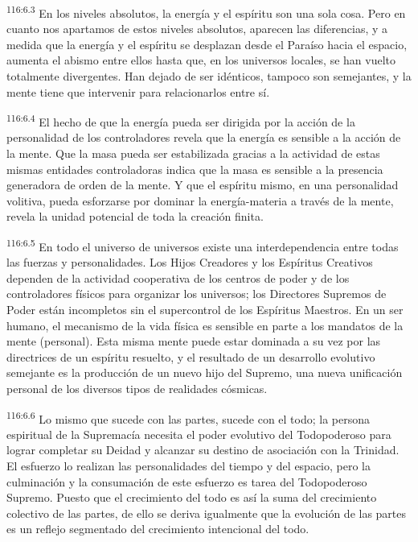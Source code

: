 \documentclass[twoside, 11pt]{book}
\begin{document}
\par
\textsuperscript{116:6.3} En los niveles absolutos, la energía y el espíritu son una sola cosa. Pero en cuanto nos apartamos de estos niveles absolutos, aparecen las diferencias, y a medida que la energía y el espíritu se desplazan desde el Paraíso hacia el espacio, aumenta el abismo entre ellos hasta que, en los universos locales, se han vuelto totalmente divergentes. Han dejado de ser idénticos, tampoco son semejantes, y la mente tiene que intervenir para relacionarlos entre sí.

\par
\textsuperscript{116:6.4} El hecho de que la energía pueda ser dirigida por la acción de la personalidad de los controladores revela que la energía es sensible a la acción de la mente. Que la masa pueda ser estabilizada gracias a la actividad de estas mismas entidades controladoras indica que la masa es sensible a la presencia generadora de orden de la mente. Y que el espíritu mismo, en una personalidad volitiva, pueda esforzarse por dominar la energía-materia a través de la mente, revela la unidad potencial de toda la creación finita.

\par
\textsuperscript{116:6.5} En todo el universo de universos existe una interdependencia entre todas las fuerzas y personalidades. Los Hijos Creadores y los Espíritus Creativos dependen de la actividad cooperativa de los centros de poder y de los controladores físicos para organizar los universos; los Directores Supremos de Poder están incompletos sin el supercontrol de los Espíritus Maestros. En un ser humano, el mecanismo de la vida física es sensible en parte a los mandatos de la mente (personal). Esta misma mente puede estar dominada a su vez por las directrices de un espíritu resuelto, y el resultado de un desarrollo evolutivo semejante es la producción de un nuevo hijo del Supremo, una nueva unificación personal de los diversos tipos de realidades cósmicas.

\par
\textsuperscript{116:6.6} Lo mismo que sucede con las partes, sucede con el todo; la persona espiritual de la Supremacía necesita el poder evolutivo del Todopoderoso para lograr completar su Deidad y alcanzar su destino de asociación con la Trinidad. El esfuerzo lo realizan las personalidades del tiempo y del espacio, pero la culminación y la consumación de este esfuerzo es tarea del Todopoderoso Supremo. Puesto que el crecimiento del todo es así la suma del crecimiento colectivo de las partes, de ello se deriva igualmente que la evolución de las partes es un reflejo segmentado del crecimiento intencional del todo.
\end{document}
